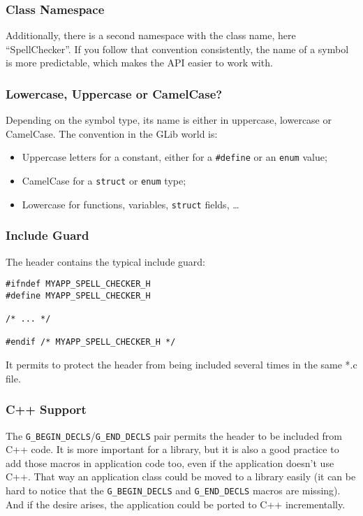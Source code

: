 \subsubsection{Class Namespace}
Additionally, there is a second namespace with the class name, here ``SpellChecker''. If you follow that convention consistently, the name of a symbol is more predictable, which makes the API easier to work with.

\subsubsection{Lowercase, Uppercase or CamelCase?}
Depending on the symbol type, its name is either in uppercase, lowercase or CamelCase. The convention in the GLib world is:
\begin{itemize}
  \item Uppercase letters for a constant, either for a \lstinline{#define} or an \lstinline{enum} value;
  \item CamelCase for a \lstinline{struct} or \lstinline{enum} type;
  \item Lowercase for functions, variables, \lstinline{struct} fields, …
\end{itemize}

\subsubsection{Include Guard}
The header contains the typical include guard:

\begin{lstlisting}
#ifndef MYAPP_SPELL_CHECKER_H
#define MYAPP_SPELL_CHECKER_H

/* ... */

#endif /* MYAPP_SPELL_CHECKER_H */
\end{lstlisting}

It permits to protect the header from being included several times in the same *.c file.

\subsubsection{C++ Support}
The \lstinline{G_BEGIN_DECLS}/\lstinline{G_END_DECLS} pair permits the header to be included from C++ code. It is more important for a library, but it is also a good practice to add those macros in application code too, even if the application doesn't use C++. That way an application class could be moved to a library easily (it can be hard to notice that the \lstinline{G_BEGIN_DECLS} and \lstinline{G_END_DECLS} macros are missing). And if the desire arises, the application could be ported to C++ incrementally.

